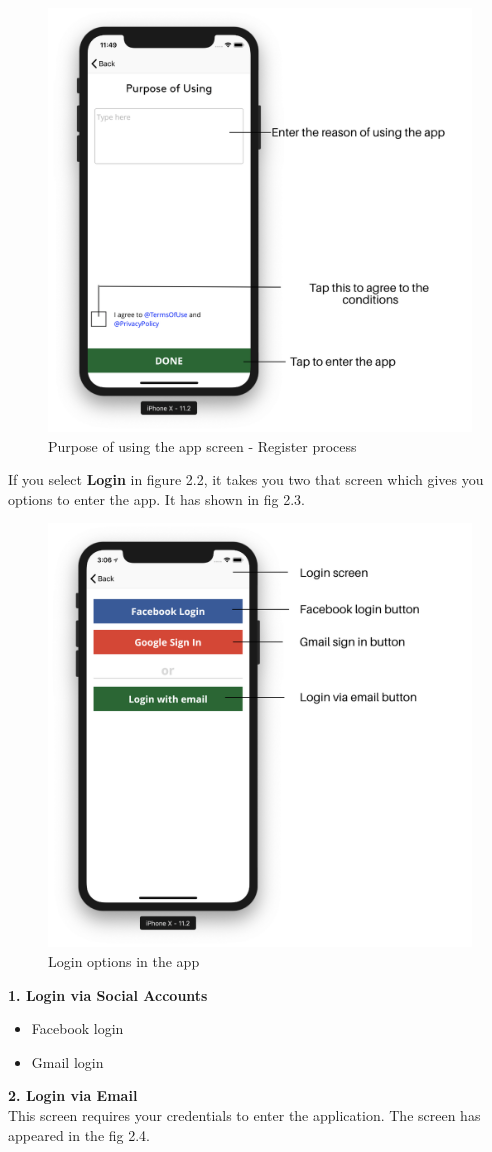 \begin{itemize}
        \begin{figure}[H]
            \centering
            \includegraphics[width=0.50\linewidth]{figures/ch2/purpose_app.png}
            \caption{\label{fig:purpose_app} Purpose of using the app screen - Register process}
        \end{figure}

    
    If you select \textbf{Login} in figure 2.2, it takes you two that screen which gives you options to enter the app. It has shown in fig 2.3.
    
    \begin{figure}[H]
            \centering
            \includegraphics[width=0.50\linewidth]{figures/ch2/loginOptions.png}
            \caption{\label{fig:loginOptions} Login options in the app}
    \end{figure}
    
     \textbf{1. Login via Social Accounts}
     \begin{itemize}
         \item Facebook login
         \item Gmail login
     \end{itemize}
   
     \textbf{2. Login via Email} \\
    This screen requires your credentials to enter the application. The screen has appeared in the fig 2.4.
     

\end{itemize}
